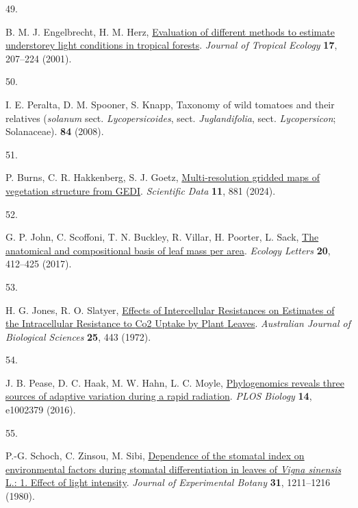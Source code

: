 \documentclass[
  letterpaper,
  DIV=11,
  numbers=noendperiod]{scrartcl}
\newlength{\cslhangindent}
\newlength{\csllabelwidth}
\newenvironment{CSLReferences}[2] %
 {\begin{list}{}{%
  \setlength{\itemindent}{0pt}
  \setlength{\leftmargin}{0pt}
  \setlength{\parsep}{0pt}
  \ifodd #1
   \setlength{\leftmargin}{\cslhangindent}
   \setlength{\itemindent}{-1\cslhangindent}
  \fi
  \setlength{\itemsep}{#2\baselineskip}}}
 {\end{list}}
\newcommand{\CSLLeftMargin}[1]{\parbox[t]{\csllabelwidth}{\strut#1\strut}}
\newcommand{\CSLRightInline}[1]{\parbox[t]{\linewidth - \csllabelwidth}{\strut#1\strut}}
\begin{document}
\begin{CSLReferences}{0}{1}
\CSLLeftMargin{49. }%
\CSLRightInline{B. M. J. Engelbrecht, H. M. Herz,
\href{https://doi.org/10.1017/S0266467401001146}{Evaluation of different
methods to estimate understorey light conditions in tropical forests}.
\emph{Journal of Tropical Ecology} \textbf{17}, 207--224 (2001).}

\CSLLeftMargin{50. }%
\CSLRightInline{I. E. Peralta, D. M. Spooner, S. Knapp, Taxonomy of wild
tomatoes and their relatives (\emph{solanum} sect.
\emph{Lycopersicoides}, sect. \emph{Juglandifolia}, sect.
\emph{Lycopersicon}; {Solanaceae}). \textbf{84} (2008).}

\CSLLeftMargin{51. }%
\CSLRightInline{P. Burns, C. R. Hakkenberg, S. J. Goetz,
\href{https://doi.org/10.1038/s41597-024-03668-4}{Multi-resolution
gridded maps of vegetation structure from {GEDI}}. \emph{Scientific
Data} \textbf{11}, 881 (2024).}

\CSLLeftMargin{52. }%
\CSLRightInline{G. P. John, C. Scoffoni, T. N. Buckley, R. Villar, H.
Poorter, L. Sack, \href{https://doi.org/10.1111/ele.12739}{The
anatomical and compositional basis of leaf mass per area}. \emph{Ecology
Letters} \textbf{20}, 412--425 (2017).}

\CSLLeftMargin{53. }%
\CSLRightInline{H. G. Jones, R. O. Slatyer,
\href{https://doi.org/10.1071/BI9720443}{Effects of {Intercellular}
{Resistances} on {Estimates} of the {Intracellular} {Resistance} to
{Co2} {Uptake} by {Plant} {Leaves}}. \emph{Australian Journal of
Biological Sciences} \textbf{25}, 443 (1972).}

\CSLLeftMargin{54. }%
\CSLRightInline{J. B. Pease, D. C. Haak, M. W. Hahn, L. C. Moyle,
\href{https://doi.org/10.1371/journal.pbio.1002379}{Phylogenomics
reveals three sources of adaptive variation during a rapid radiation}.
\emph{PLOS Biology} \textbf{14}, e1002379 (2016).}

\CSLLeftMargin{55. }%
\CSLRightInline{P.-G. Schoch, C. Zinsou, M. Sibi,
\href{https://doi.org/10.1093/jxb/31.5.1211}{Dependence of the stomatal
index on environmental factors during stomatal differentiation in leaves
of \emph{{Vigna} sinensis} {L}.: 1. {Effect} of light intensity}.
\emph{Journal of Experimental Botany} \textbf{31}, 1211--1216 (1980).}


\end{CSLReferences}
\end{document}
